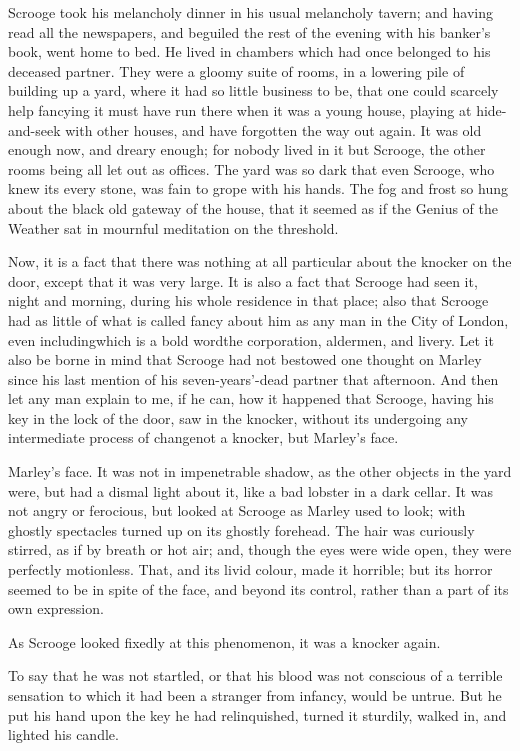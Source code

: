 \documentclass[paper=5.5in:8.5in,BCOR=5mm,twoside,DIV=calc,12pt,usegeometry]{scrbook} %
\begin{document}
Scrooge took his melancholy dinner in his usual melancholy tavern; and having read all the newspapers, and beguiled the rest of the evening with his banker's book, went home to bed. He lived in chambers which had once belonged to his deceased partner. They were a gloomy suite of rooms, in a lowering pile of building up a yard, where it had so little business to be, that one could scarcely help fancying it must have run there when it was a young house, playing at hide-and-seek with other houses, and have forgotten the way out again. It was old enough now, and dreary enough; for nobody lived in it but Scrooge, the other rooms being all let out as offices. The yard was so dark that even Scrooge, who knew its every stone, was fain to grope with his hands. The fog and frost so hung about the black old gateway of the house, that it seemed as if the Genius of the Weather sat in mournful meditation on the threshold.

Now, it is a fact that there was nothing at all particular about the knocker on the door, except that it was very large. It is also a fact that Scrooge had seen it, night and morning, during his whole residence in that place; also that Scrooge had as little of what is called fancy about him as any man in the City of London, even including\textemdash which is a bold word\textemdash the corporation, aldermen, and livery. Let it also be borne in mind that Scrooge had not bestowed one thought on Marley since his last mention of his seven-years'-dead partner that afternoon. And then let any man explain to me, if he can, how it happened that Scrooge, having his key in the lock of the door, saw in the knocker, without its undergoing any intermediate process of change\textemdash not a knocker, but Marley's face.

Marley's face. It was not in impenetrable shadow, as the other objects in the yard were, but had a dismal light about it, like a bad lobster in a dark cellar. It was not angry or ferocious, but looked at Scrooge as Marley used to look; with ghostly spectacles turned up on its ghostly forehead. The hair was curiously stirred, as if by breath or hot air; and, though the eyes were wide open, they were perfectly motionless. That, and its livid colour, made it horrible; but its horror seemed to be in spite of the face, and beyond its control, rather than a part of its own expression.

As Scrooge looked fixedly at this phenomenon, it was a knocker again.

To say that he was not startled, or that his blood was not conscious of a terrible sensation to which it had been a stranger from infancy, would be untrue. But he put his hand upon the key he had relinquished, turned it sturdily, walked in, and lighted his candle.
\end{document}
